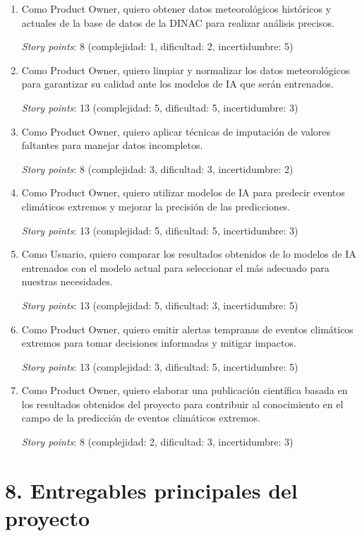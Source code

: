 \documentclass[
11pt, %
codirector, %
]{charter}
\begin{document}
\begin{enumerate}
\item Como Product Owner, quiero obtener datos meteorológicos históricos y actuales de la base de datos de la DINAC para realizar análisis precisos.

\textit{Story points}: 8 (complejidad: 1, dificultad: 2, incertidumbre: 5)

\item Como Product Owner, quiero limpiar y normalizar los datos meteorológicos para garantizar su calidad ante los modelos de IA que serán entrenados.

\textit{Story points}: 13 (complejidad: 5, dificultad: 5, incertidumbre: 3)

\item Como Product Owner, quiero aplicar técnicas de imputación de valores faltantes para manejar datos incompletos.

\textit{Story points}: 8 (complejidad: 3, dificultad: 3, incertidumbre: 2)

\item Como Product Owner, quiero utilizar modelos de IA para predecir eventos climáticos extremos y mejorar la precisión de las predicciones.

\textit{Story points}: 13 (complejidad: 5, dificultad: 5, incertidumbre: 3)

\item Como Usuario, quiero comparar los resultados obtenidos de lo modelos de IA entrenados con el modelo actual para seleccionar el más adecuado para nuestras necesidades.

\textit{Story points}: 13 (complejidad: 5, dificultad: 3, incertidumbre: 5)

\item Como Product Owner, quiero emitir alertas tempranas de eventos climáticos extremos para tomar decisiones informadas y mitigar impactos.

\textit{Story points}: 13 (complejidad: 3, dificultad: 5, incertidumbre: 5)

\item Como Product Owner, quiero elaborar una publicación científica basada en los resultados obtenidos del proyecto para contribuir al conocimiento en el campo de la predicción de eventos climáticos extremos.

\textit{Story points}: 8 (complejidad: 2, dificultad: 3, incertidumbre: 3)
\end{enumerate}

\section{8. Entregables principales del proyecto}
\label{sec:entregables}
\end{document}
